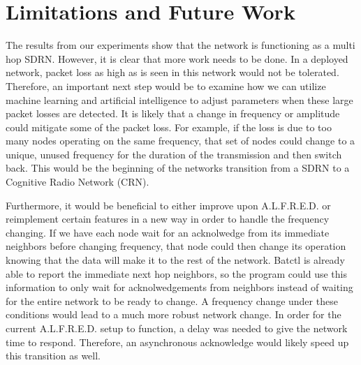 \section{Limitations and Future Work}

The results from our experiments show that the network is functioning as a multi hop SDRN. However, it is clear that more work needs to be done. In a deployed network, packet loss as high as is seen in this network would not be tolerated. Therefore, an important next step would be to examine how we can utilize machine learning and artificial intelligence to adjust parameters when these large packet losses are detected. It is likely that a change in frequency or amplitude could mitigate some of the packet loss. For example, if the loss is due to too many nodes operating on the same frequency, that set of nodes could change to a unique, unused frequency for the duration of the transmission and then switch back. This would be the beginning of the networks transition from a SDRN to a Cognitive Radio Network (CRN). 

Furthermore, it would be beneficial to either improve upon A.L.F.R.E.D. or reimplement certain features in a new way in order to handle the frequency changing. If we have each node wait for an acknolwedge from its immediate neighbors before changing frequency, that node could then change its operation knowing that the data will make it to the rest of the network. Batctl is already able to report the immediate next hop neighbors, so the program could use this information to only wait for acknolwedgements from neighbors instead of waiting for the entire network to be ready to change. A frequency change under these conditions would lead to a much more robust network change. In order for the current A.L.F.R.E.D. setup to function, a delay was needed to give the network time to respond. Therefore, an asynchronous acknowledge would likely speed up this transition as well. 

